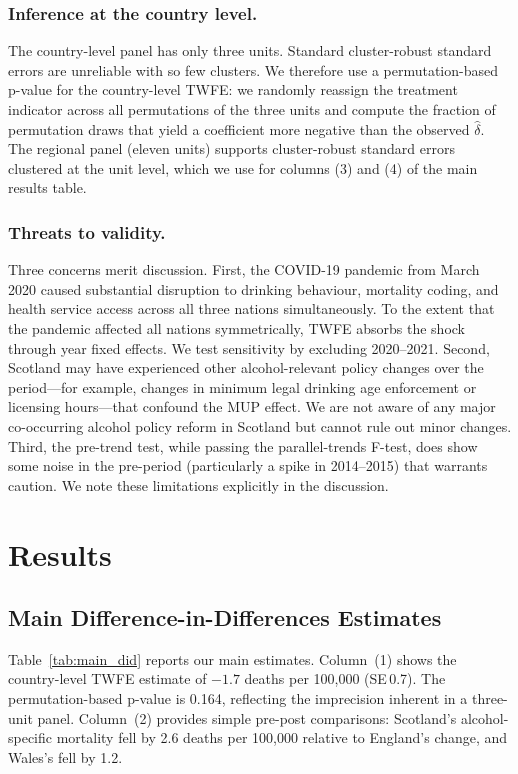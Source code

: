 \documentclass[12pt]{article}
\begin{document}
\subsubsection*{Inference at the country level.} The country-level panel has only three units. Standard cluster-robust standard errors are unreliable with so few clusters. We therefore use a permutation-based p-value for the country-level TWFE: we randomly reassign the treatment indicator across all permutations of the three units and compute the fraction of permutation draws that yield a coefficient more negative than the observed $\hat{\delta}$. The regional panel (eleven units) supports cluster-robust standard errors clustered at the unit level, which we use for columns (3) and (4) of the main results table.

\subsubsection*{Threats to validity.} Three concerns merit discussion. First, the COVID-19 pandemic from March 2020 caused substantial disruption to drinking behaviour, mortality coding, and health service access across all three nations simultaneously. To the extent that the pandemic affected all nations symmetrically, TWFE absorbs the shock through year fixed effects. We test sensitivity by excluding 2020--2021. Second, Scotland may have experienced other alcohol-relevant policy changes over the period---for example, changes in minimum legal drinking age enforcement or licensing hours---that confound the MUP effect. We are not aware of any major co-occurring alcohol policy reform in Scotland but cannot rule out minor changes. Third, the pre-trend test, while passing the parallel-trends F-test, does show some noise in the pre-period (particularly a spike in 2014--2015) that warrants caution. We note these limitations explicitly in the discussion.

\section{Results}
\label{sec:results}

\subsection{Main Difference-in-Differences Estimates}

Table~\ref{tab:main_did} reports our main estimates. Column~(1) shows the country-level TWFE estimate of $-1.7$ deaths per 100,000 (SE\,0.7). The permutation-based p-value is 0.164, reflecting the imprecision inherent in a three-unit panel. Column~(2) provides simple pre-post comparisons: Scotland's alcohol-specific mortality fell by 2.6 deaths per 100,000 relative to England's change, and Wales's fell by 1.2.
\end{document}
